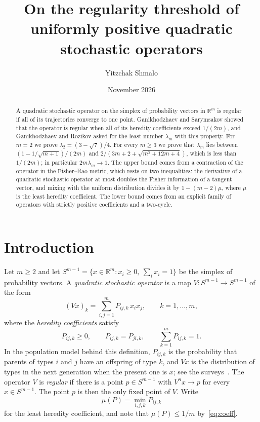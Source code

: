 \documentclass[11pt]{amsart}
\title[The regularity threshold of positive quadratic stochastic operators]{On the regularity threshold of uniformly positive quadratic stochastic operators}
\author{Yitzchak Shmalo}
\date{November 2026}
\theoremstyle{definition}
\theoremstyle{remark}
\newcommand{\R}{\mathbb{R}}
\begin{document}
\begin{abstract}
A quadratic stochastic operator on the simplex of probability vectors in $\R^m$ is regular if all of its trajectories
converge to one point. Ganikhodzhaev and Sarymsakov showed that the operator is regular when all of its heredity
coefficients exceed $1/(2m)$, and Ganikhodzhaev and Rozikov asked for the least number $\lambda_m$ with this property.
For $m=2$ we prove $\lambda_2=(3-\sqrt7)/4$. For every $m\ge3$ we prove that $\lambda_m$ lies between
$(1-1/\sqrt{m+1})/(2m)$ and $2/(3m+2+\sqrt{m^2+12m+4})$, which is less than $1/(2m)$; in particular
$2m\lambda_m\to1$. The upper bound comes from a contraction of the operator in the Fisher--Rao metric, which
rests on two inequalities: the derivative of a quadratic stochastic operator at most doubles the Fisher information of
a tangent vector, and mixing with the uniform distribution divides it by $1-(m-2)\mu$, where $\mu$ is the least
heredity coefficient. The lower bound comes from an explicit family of operators with strictly positive coefficients
and a two-cycle.
\end{abstract}
\maketitle

\section{Introduction}\label{sec:intro}

Let $m\ge2$ and let $S^{m-1}=\{x\in\R^m:x_i\ge0,\ \sum_ix_i=1\}$ be the simplex of probability vectors. A
\emph{quadratic stochastic operator} is a map $V:S^{m-1}\to S^{m-1}$ of the form
\begin{equation}\label{eq:qso}
(Vx)_k=\sum_{i,j=1}^m P_{ij,k}\,x_ix_j,\qquad k=1,\dots,m,
\end{equation}
where the \emph{heredity coefficients} satisfy
\begin{equation}\label{eq:coeff}
P_{ij,k}\ge0,\qquad P_{ij,k}=P_{ji,k},\qquad \sum_{k=1}^mP_{ij,k}=1 .
\end{equation}
In the population model behind this definition, $P_{ij,k}$ is the probability that parents of types $i$ and $j$ have
an offspring of type $k$, and $Vx$ is the distribution of types in the next generation when the present one is $x$; see
the surveys~\cite{GR09,GMR11}. The operator $V$ is \emph{regular} if there is a point $p\in S^{m-1}$ with $V^nx\to p$
for every $x\in S^{m-1}$. The point $p$ is then the only fixed point of $V$. Write
\[
\mu(P)=\min_{i,j,k}P_{ij,k}
\]
for the least heredity coefficient, and note that $\mu(P)\le1/m$ by~\eqref{eq:coeff}.
\end{document}
